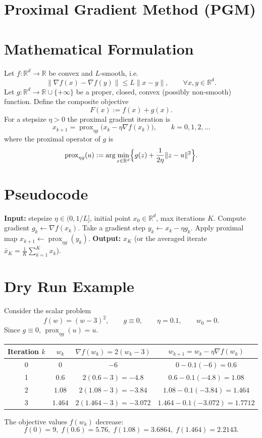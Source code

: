 \documentclass{article}
\newcommand{\prox}{\operatorname{prox}}
\newcommand{\grad}{\nabla}
\begin{document}
\section*{Proximal Gradient Method (PGM)}

\section*{Mathematical Formulation}
Let $f:\mathbb{R}^{d}\to\mathbb{R}$ be convex and $L$‑smooth, i.e.
\[
\|\grad f(x)-\grad f(y)\|\le L\|x-y\|,\qquad\forall x,y\in\mathbb{R}^{d}.
\]
Let $g:\mathbb{R}^{d}\to\mathbb{R}\cup\{+\infty\}$ be a proper, closed, convex (possibly non‑smooth) function.  
Define the composite objective
\[
F(x):=f(x)+g(x).
\]
For a stepsize $\eta>0$ the proximal gradient iteration is
\begin{equation}
\label{eq:pgm}
x_{k+1}= \prox_{\eta g}\bigl(x_{k}-\eta \grad f(x_{k})\bigr),\qquad k=0,1,2,\dots
\end{equation}
where the proximal operator of $g$ is
\[
\prox_{\eta g}(u):=\arg\min_{z\in\mathbb{R}^{d}}\Bigl\{ g(z)+\frac{1}{2\eta}\|z-u\|^{2}\Bigr\}.
\]

\section*{Pseudocode}
\begin{algorithm}[H]
\caption{Proximal Gradient Method}
\begin{algorithmic}[1]
\STATE \textbf{Input:} stepsize $\eta\in(0,1/L]$, initial point $x_{0}\in\mathbb{R}^{d}$, max iterations $K$.
\STATE Compute gradient $g_{k}\gets \grad f(x_{k})$.
\STATE Take a gradient step $y_{k}\gets x_{k}-\eta g_{k}$.
\STATE Apply proximal map $x_{k+1}\gets \prox_{\eta g}(y_{k})$.
\ENDFOR
\STATE \textbf{Output:} $x_{K}$ (or the averaged iterate $\bar x_{K}=\frac1K\sum_{k=1}^{K}x_{k}$).
\end{algorithmic}
\end{algorithm}

\section*{Dry Run Example}
Consider the scalar problem
\[
f(w)=(w-3)^{2},\qquad g\equiv 0,\qquad \eta=0.1,\qquad w_{0}=0.
\]
Since $g\equiv0$, $\prox_{\eta g}(u)=u$.

\begin{center}
\begin{tabular}{c|c|c|c}
Iteration $k$ & $w_{k}$ & $\grad f(w_{k})=2(w_{k}-3)$ & $w_{k+1}=w_{k}-\eta\grad f(w_{k})$ \\ \hline
0 & $0$ & $-6$ & $0-0.1(-6)=0.6$ \\ 
1 & $0.6$ & $2(0.6-3)=-4.8$ & $0.6-0.1(-4.8)=1.08$ \\ 
2 & $1.08$ & $2(1.08-3)=-3.84$ & $1.08-0.1(-3.84)=1.464$ \\ 
3 & $1.464$ & $2(1.464-3)=-3.072$ & $1.464-0.1(-3.072)=1.7712$
\end{tabular}
\end{center}
The objective values $f(w_{k})$ decrease:
\[
f(0)=9,\; f(0.6)=5.76,\; f(1.08)=3.6864,\; f(1.464)=2.2143.
\]
\end{document}
